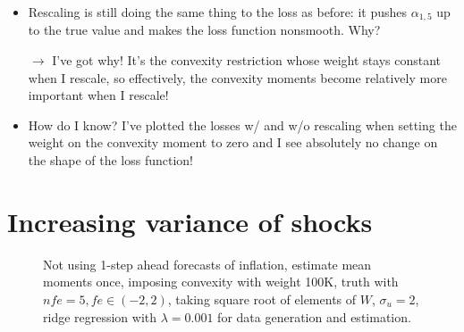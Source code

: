 \documentclass[11pt]{article}
\def \myFigPath {../../figures/}
\renewcommand{\[}{\begin{equation}}
\renewcommand{\]}{\end{equation}}
\begin{document}
\begin{itemize}
\item Rescaling is still doing the same thing to the loss as before: it pushes $\alpha_{1,5}$ up to the true value and makes the loss function nonsmooth. Why?
\item[$\rightarrow$] I've got why! It's the convexity restriction whose weight stays constant when I rescale, so effectively, the convexity moments become relatively more important when I rescale!
\item How do I know? I've plotted the losses w/ and w/o rescaling when setting the weight on the convexity moment to zero and I see absolutely no change on the shape of the loss function!
\end{itemize}

\newpage
\section{Increasing variance of shocks}
\begin{figure}[h!]
\caption{Not using 1-step ahead forecasts of inflation, estimate mean moments once, imposing convexity with weight 100K, truth with $nfe=5, fe \in(-2,2)$, taking square root of elements of $W$, $\sigma_u=2$, ridge regression with $\lambda=0.001$ for data generation and estimation.}
\end{figure}
\end{document}
